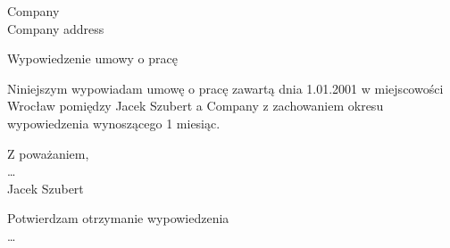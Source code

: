 \documentclass[a4paper]{letter}
\def\Name{Jacek Szubert}
\def\CompanyName{Company}
\def\CompanyAddress{Company address}
\def\CompanyDetails{\CompanyName \\ \CompanyAddress}
\def\DateOfContract{1.01.2001}
\def\CityOfContract{Wrocław}
\def\NoticePeriod{1 miesiąc}
\begin{document}
\begin{letter}{\CompanyDetails}
{
    \opening{\noindent Wypowiedzenie umowy o pracę}{}
        Niniejszym wypowiadam umowę o pracę zawartą dnia \DateOfContract{} %
        w miejscowości \CityOfContract{} pomiędzy \Name{} a \CompanyName{} z zachowaniem %
        okresu wypowiedzenia wynoszącego \NoticePeriod.
    \closing{Z poważaniem, \\ \ldots \\ \Name}}
{\noindent Potwierdzam otrzymanie wypowiedzenia \\ \ldots}

\end{letter}
\end{document}
